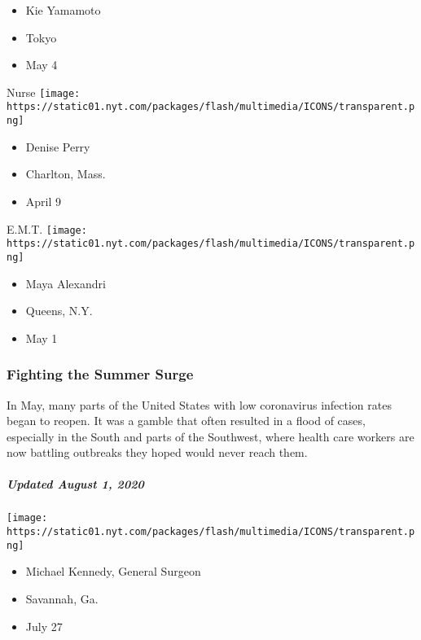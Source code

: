 \begin{itemize}
\tightlist
\item
  Kie Yamamoto
\item
  Tokyo
\item
  May 4
\end{itemize}

\protect\hyperlink{item-denise-perry}{}

Nurse
\texttt{[image: https://static01.nyt.com/packages/flash/multimedia/ICONS/transparent.png]}

\begin{itemize}
\tightlist
\item
  Denise Perry
\item
  Charlton, Mass.
\item
  April 9
\end{itemize}

\protect\hyperlink{item-maya-alexandri}{}

E.M.T.
\texttt{[image: https://static01.nyt.com/packages/flash/multimedia/ICONS/transparent.png]}

\begin{itemize}
\tightlist
\item
  Maya Alexandri
\item
  Queens, N.Y.
\item
  May 1
\end{itemize}

\hypertarget{fighting-the-summer-surge-1}{%
\subsubsection{Fighting the Summer
Surge}\label{fighting-the-summer-surge-1}}

In May, many parts of the United States with low coronavirus infection
rates began to reopen. It was a gamble that often resulted in a flood of
cases, especially in the South and parts of the Southwest, where health
care workers are now battling outbreaks they hoped would never reach
them.

\hypertarget{updated-august-1-2020-2}{%
\subparagraph{Updated August 1, 2020}\label{updated-august-1-2020-2}}

\texttt{[image: https://static01.nyt.com/packages/flash/multimedia/ICONS/transparent.png]}

\begin{itemize}
\tightlist
\item
  Michael Kennedy, General Surgeon
\item
  Savannah, Ga.
\item
  July 27
\end{itemize}

